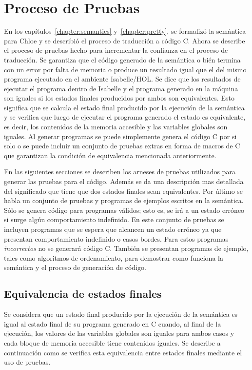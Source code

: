 \chapter{Proceso de Pruebas}\label{chapter:testing}

En los capítulos~\ref{chapter:semantics} y~\ref{chapter:pretty}, se formalizó la semántica para Chloe y se describió el proceso de traducción a código C.
Ahora se describe el proceso de pruebas hecho para incrementar la confianza en el proceso de traducción.
Se garantiza que el código generado de la semántica o bién termina con un error por falta de memoria o produce un resultado igual que el del mismo programa ejecutado en el ambiente Isabelle/HOL.
Se dice que los resultados de ejecutar el programa dentro de Isabelle y el programa generado en la máquina son iguales si los estados finales producidos por ambos son equivalentes.
Esto significa que se calcula el estado final producido por la ejecución de la semántica y se verifica que luego de ejecutar el programa generado el estado es equivalente, es decir, los contenidos de la memoria accesible y las variables globales son iguales.
Al generar programas se puede simplemente genera el código C por si solo o se puede incluir un conjunto de pruebas extras en forma de macros de C que garantizan la condición de equivalencia mencionada anteriormente.

En las siguientes secciones se describen los arneses de pruebas utilizados para generar las pruebas para el código.
Además se da una descripción mas detallada del significado que tiene que dos estados finales sean equivalentes.
Por último se habla un conjunto de pruebas y programas de ejemplos escritos en la semántica.
Sólo se genera código para programas válidos; esto es, se irá a un estado erróneo si surge algún comportamiento indefinido.
En este conjunto de pruebas se incluyen programas que se espera que alcancen un estado erróneo ya que presentan comportamiento indefinido o casos bordes.
Para estos programas \textit{incorrectos} no se generará código C.
También se presentan programas de ejemplo, tales como algoritmos de ordenamiento, para demostrar como funciona la semántica y el proceso de generación de código.


\section{Equivalencia de estados finales}

Se considera que un estado final producido por la ejecución de la semántica es igual al estado final de su programa generado en C cuando, al final de la ejecución, los valores de las variables globales son iguales para ambos casos y cada bloque de memoria accesible tiene contenidos iguales.
Se describe a continuación como se verifica esta equivalencia entre estados finales mediante el uso de pruebas.


